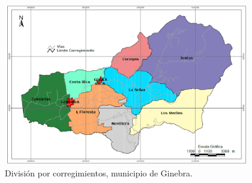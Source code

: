 \documentclass[12pt,letterpaper,openany]{book}
\begin{document}
\begin{figure}[H]
\begin{center}
\includegraphics[width=10.7cm]{./imagenes/division_corregimientos}
\caption{División por corregimientos, municipio de Ginebra. \cite{4}}
\end{center}
\end{figure}
\end{document}
